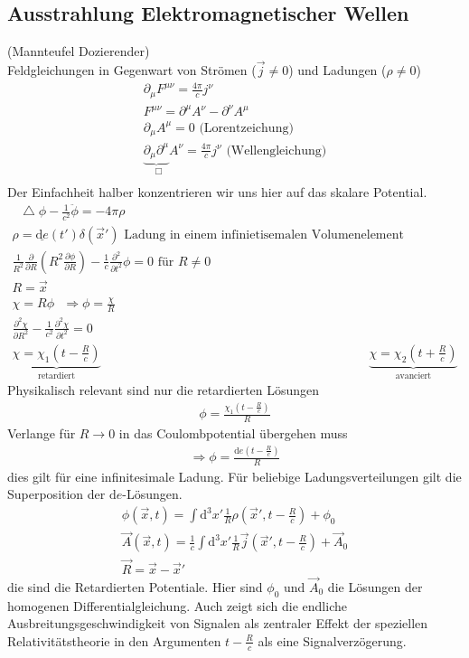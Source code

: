 \documentclass[a4paper]{article}
\newcommand*\laplace{\mathop{}\!\mathbin\bigtriangleup}
\newcommand*\dalembert{\mathop{}\!\mathbin\Box}
\begin{document}
\subsection{Ausstrahlung Elektromagnetischer Wellen}
(Mannteufel Dozierender)\\
Feldgleichungen in Gegenwart von Strömen ($\vec{j}\neq0$) und Ladungen
($\rho\neq0$)\\
\begin{align}
\partial_\mu F^{\mu\nu}=\frac{4\pi}{c}j^\nu\\
F^{\mu\nu}=\partial^\mu A^\nu-\partial^\nu A^\mu\\
\partial_\mu A^\mu=0 \text{ (Lorentzeichung)}\\
\underbrace{\partial_\mu \partial^\mu}_{\dalembert} A^\nu=\frac{4\pi}{c}j^\nu
\text{ (Wellengleichung)}\\
\end{align}
Der Einfachheit halber konzentrieren wir uns hier auf das skalare Potential.
\begin{align}
\laplace\phi-\frac{1}{c^2}\ddot{\phi}=-4\pi\rho\\
\rho=\underline{\mathrm{d}e}(t')\delta(\vec{x}') \text{ Ladung in einem infinietisemalen
Volumenelement}\\
\frac{1}{R^2}\frac{\partial}{\partial R} \left( R^2 \frac{\partial\phi}{\partial
R}\right)-\frac{1}{c}\frac{\partial^2}{\partial t^2}\phi=0 \text{ für }R\neq0\\
R=\vec{x}\\
\chi=R\phi \text{  }\Rightarrow \phi=\frac{\chi}{R}\\
\frac{\partial^2\chi}{\partial R^2}-\frac{1}{c^2}\frac{\partial^2\chi}{\partial
t^2}=0\\
\underbrace{\chi=\chi_1(t-\frac{R}{c})}_{\text{retardiert}} &
\underbrace{\chi=\chi_2(t+\frac{R}{c})}_{\text{avanciert}}
\end{align}
Physikalisch relevant sind nur die retardierten Lösungen
\begin{align}
\phi=\frac{\chi_1(t-\frac{R}{c})}{R}
\end{align}
Verlange für $R\rightarrow0$ in das Coulombpotential übergehen muss\\
\begin{align}
\Rightarrow \phi=\frac{\mathrm{d}e\left(t-\frac{R}{c}\right)}{R}
\end{align}
dies gilt für eine infinitesimale Ladung. Für beliebige Ladungsverteilungen gilt
die Superposition der $\mathrm{d}e$-Lösungen.
\begin{align}
\phi(\vec{x},t)=\int \mathrm{d}^3x'
\frac{1}{R}\rho\left(\vec{x}',t-\frac{R}{c}\right)+\phi_0\\
\vec{A}(\vec{x},t)=\frac{1}{c}\int
\mathrm{d}^3x'\frac{1}{R}\vec{j}\left(\vec{x}',t-\frac{R}{c}\right)+\vec{A}_0\\
\vec{R}=\vec{x}-\vec{x}'
\end{align}
die sind die Retardierten Potentiale. Hier sind $\phi_0$ und $\vec{A}_0$ die
Lösungen der homogenen Differentialgleichung. Auch zeigt sich die endliche
Ausbreitungsgeschwindigkeit von Signalen als zentraler Effekt der speziellen
Relativitätstheorie in den Argumenten $t-\frac{R}{c}$ als eine
Signalverzögerung.
\end{document}
